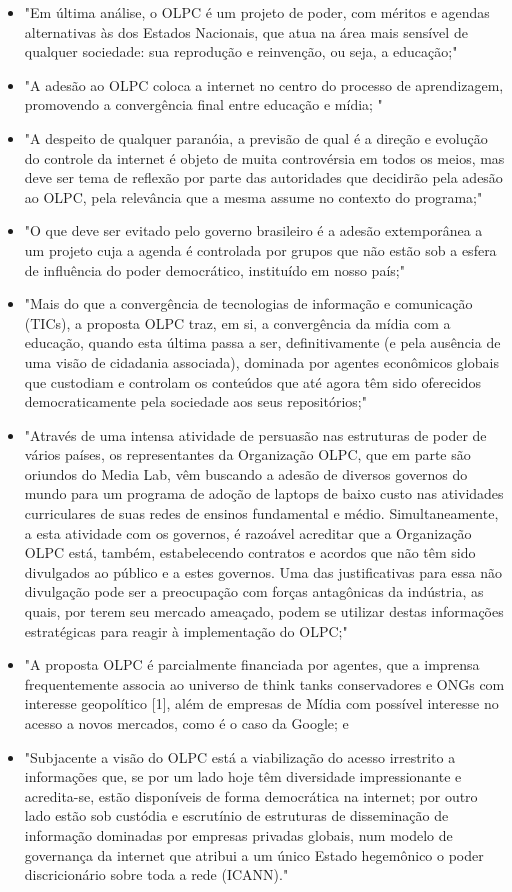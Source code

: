 \begin{itemize}
\item "Em última análise, o OLPC é um projeto de poder, com méritos e agendas alternativas às dos Estados Nacionais, que atua na área mais sensível de qualquer sociedade: sua reprodução e reinvenção, ou seja, a educação;"
\item "A adesão ao OLPC coloca a internet no centro do processo de aprendizagem, promovendo a convergência final entre educação e mídia; "
\item "A despeito de qualquer paranóia, a previsão de qual é a direção e evolução do controle da internet é objeto de muita controvérsia em todos os meios, mas deve ser tema de reflexão por parte das autoridades que decidirão pela adesão ao OLPC, pela relevância que a mesma assume no contexto do programa;"
\item "O que deve ser evitado pelo governo brasileiro é a adesão extemporânea a um projeto cuja a agenda é controlada por grupos que não estão sob a esfera de influência do poder democrático, instituído em nosso país;"
\item "Mais do que a convergência de tecnologias de informação e comunicação (TICs), a proposta OLPC traz, em si, a convergência da mídia com a educação, quando esta última passa a ser, definitivamente (e pela ausência de uma visão de cidadania associada), dominada por agentes econômicos globais que custodiam e controlam os conteúdos que até agora têm sido oferecidos democraticamente pela sociedade aos seus repositórios;"
\item "Através de uma intensa atividade de persuasão nas estruturas de poder de vários países, os representantes da Organização OLPC, que em parte são oriundos do Media Lab, vêm buscando a adesão de diversos governos do mundo para um programa de adoção de laptops de baixo custo nas atividades curriculares de suas redes de ensinos fundamental e médio. Simultaneamente, a esta atividade com os governos, é razoável acreditar que a Organização OLPC está, também, estabelecendo contratos e acordos que não têm sido divulgados ao público e a estes governos. Uma das justificativas para essa não divulgação pode ser a preocupação com forças antagônicas da indústria, as quais, por terem seu mercado ameaçado, podem se utilizar destas informações estratégicas para reagir à implementação do OLPC;"
\item "A proposta OLPC é parcialmente financiada por agentes, que a imprensa frequentemente associa ao universo de think tanks conservadores e ONGs com interesse geopolítico [1], além de empresas de Mídia com possível interesse no acesso a novos mercados, como é o caso da Google; e
\item "Subjacente a visão do OLPC está a viabilização do acesso irrestrito a informações que, se por um lado hoje têm diversidade impressionante e acredita-se, estão disponíveis de forma democrática na internet; por outro lado estão sob custódia e escrutínio de estruturas de disseminação de informação dominadas por empresas privadas globais, num modelo de governança da internet que atribui a um único Estado hegemônico o poder discricionário sobre toda a rede (ICANN)."
\end{itemize}

